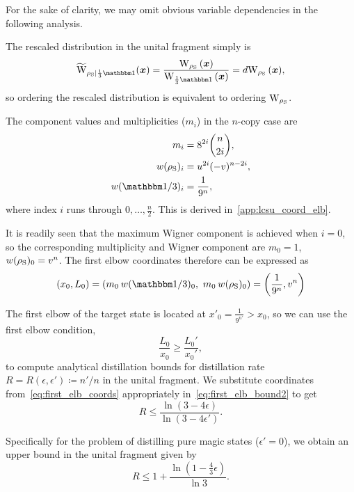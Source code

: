 \documentclass[pra,
aps,
twocolumn,
superscriptaddress,
groupedaddress,
nofootinbib,
reprint
]{revtex4-1}
\begin{document}
For the sake of clarity, we may omit obvious variable dependencies in the following analysis.

The rescaled distribution in the unital fragment simply is 
\begin{equation}
	\widetilde{\rm{W}}_{\rho_{\rm{S}}|\frac{1}{3}\id}(\bmx) = \frac{\W[\bmx]{\rho_{\rm{S}}}}{\W[\bmx]{\frac{1}{3}\id}} = d\W[\bmx]{\rho_{\rm{S}}},
\end{equation}
so ordering the rescaled distribution is equivalent to ordering $\W{\rho_{\rm{S}}}$.

The component values and multiplicities ($m_i$) in the $n$-copy case are 
\begin{align}
	m_i &= 8^{2i}\binom{n}{2i}, \\
	w(\rho_{\rm{S}})_i &= u^{2i}(-v)^{n-2i}, \\
	w(\id/3)_i &=  \frac{1}{9^n},
\end{align}
where index $i$ runs through $0,\dots,\frac{n}{2}$.
This is derived in~\cref{app:lcsu_coord_elb}.

It is readily seen that the maximum Wigner component is achieved when $i=0$, so the corresponding multiplicity and Wigner component are $m_0 = 1$, $w(\rho_{\rm{S}})_0 = v^n$.
The first elbow coordinates therefore can be expressed as
\begin{equation}\label{eq:first_elb_coords}
	(x_0, L_0) = (m_0\hspace{2pt} w(\id/3)_0,\ m_0\hspace{2pt} w(\rho_{\rm{S}})_0) = \left(\frac{1}{9^n}, v^n \right)
\end{equation}

The first elbow of the target state is located at $x'_0 = \frac{1}{9^{n'}} > x_0$, so we can use the first elbow condition,
\begin{equation}\label{eq:first_elb_bound2}
	\frac{L_0}{x_0} \geq \frac{L_0'}{x_0'},
\end{equation}
to compute analytical distillation bounds for distillation rate $R = R(\epsilon, \epsilon') \coloneqq n'/n$ in the unital fragment.
We substitute coordinates from~\cref{eq:first_elb_coords} appropriately in~\cref{eq:first_elb_bound2} to get
\begin{equation}
	R \leq \frac{\ln{(3-4\epsilon)}}{\ln{(3-4\epsilon')}}.
\end{equation}

Specifically for the problem of distilling pure magic states ($\epsilon'=0$), we obtain an upper bound in the unital fragment given by
\begin{equation}
	R \leq 1 + \frac{\ln (1 - \frac{4}{3} \epsilon)}{\ln 3}.
\end{equation}
\end{document}
